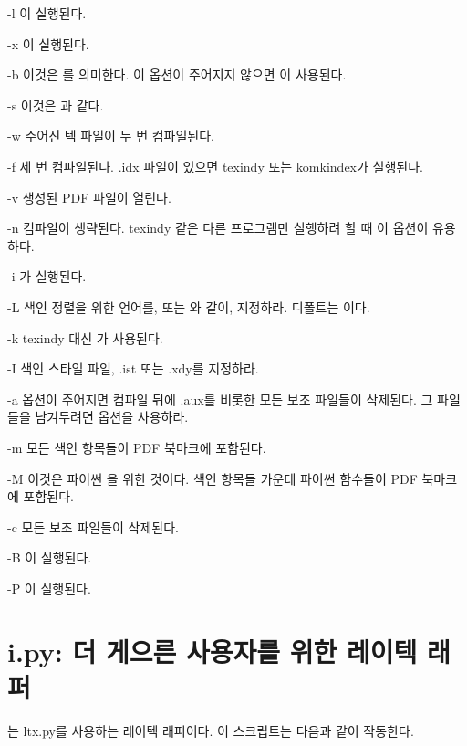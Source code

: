 \begin{macros}
\item[-l] 이 실행된다.
\item[-x] 이 실행된다.
\item[-b] 이것은 를 의미한다. 이 옵션이 주어지지 않으면 이 사용된다.
\item[-s] 이것은 과 같다.
\item[-w] 주어진 텍 파일이 두 번 컴파일된다.
\item[-f] 세 번 컴파일된다. .idx 파일이 있으면 texindy 또는 komkindex가 실행된다.
\item[-v] 생성된 PDF 파일이 열린다. 
\item[-n] 컴파일이 생략된다. texindy 같은 다른 프로그램만 실행하려 할 때 이 옵션이 유용하다.
\item[-i] 가 실행된다.
\item[-L] 색인 정렬을 위한 언어를,  또는 와 같이, 지정하라. 디폴트는 이다.
\item[-k] texindy 대신 가 사용된다.
\item[-I] 색인 스타일 파일, .ist 또는 .xdy를 지정하라.
\item[-a]  옵션이 주어지면 컴파일 뒤에 .aux를 비롯한 모든 보조 파일들이 삭제된다. 그 파일들을 남겨두려면  옵션을 사용하라.
\item[-m] 모든 색인 항목들이 PDF 북마크에 포함된다.
\item[-M] 이것은 파이썬 을 위한 것이다. 색인 항목들 가운데 파이썬 함수들이 PDF 북마크에 포함된다.
\item[-c] 모든 보조 파일들이 삭제된다.
\item[-B] 이 실행된다.
\item[-P] 이 실행된다.
\end{macros}

\section{i.py: 더 게으른 사용자를 위한 레이텍 래퍼}

는 ltx.py를 사용하는 레이텍 래퍼이다. 이 스크립트는 다음과 같이 작동한다.

